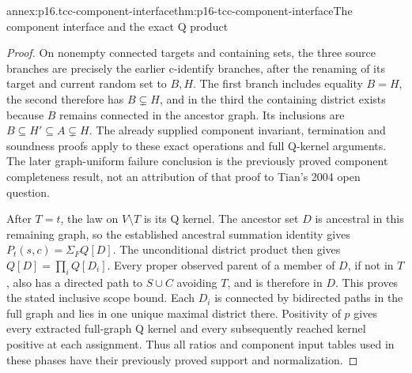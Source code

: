\begin{annexitem}{annex:p16.tcc-component-interface}{thm:p16-tcc-component-interface}{The component interface and the exact Q product}
\begin{proof}
On nonempty connected targets and containing sets, the three source
branches are precisely the earlier c-identify branches, after the
renaming of its target and current random set to \(B,H\).
The first branch includes equality \(B=H\), the second therefore
has \(B\subsetneq H\), and in the third the containing
district exists because \(B\) remains connected in the ancestor
graph. Its inclusions are \(B\subseteq H'\subseteq A\subsetneq H\).
The already supplied component invariant, termination and soundness
proofs apply to these exact operations and full Q-kernel arguments.
The later graph-uniform failure conclusion is the previously proved
component completeness result, not an attribution of that proof
to Tian's 2004 open question.

After \(T=t\), the law on \(V\setminus T\) is its Q
kernel. The ancestor set \(D\) is ancestral in this remaining
graph, so the established ancestral summation identity gives
\(P_t(s,c)=\Sigma_F Q[D]\). The unconditional district product
then gives \(Q[D]=\prod_i Q[D_i]\). Every proper observed
parent of a member of \(D\), if not in \(T\), also has
a directed path to \(S\cup C\) avoiding \(T\), and is
therefore in \(D\). This proves the stated inclusive scope bound.
Each \(D_i\) is connected by bidirected paths in the full
graph and lies in one unique maximal district there. Positivity
of \(p\) gives every extracted full-graph Q kernel and every
subsequently reached kernel positive at each assignment. Thus all
ratios and component input tables used in these phases have their
previously proved support and normalization.
\end{proof}
\end{annexitem}


